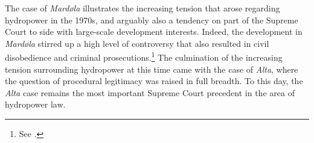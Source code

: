 


The case of {\it Mardøla} illustrates the increasing tension that arose regarding hydropower in the 1970s, and arguably also a tendency on part of the Supreme Court to side with large-scale development interests. Indeed, the development in {\it Mardøla} stirred up a high level of controversy that also resulted in civil disobedience and criminal prosecutions.\footnote{See \cite{mar71}.} The culmination of the increasing tension surrounding hydropower at this time came with the case of {\it Alta}, where the question of procedural legitimacy was raised in full breadth. To this day, the {\it Alta} case remains the most important Supreme Court precedent in the area of hydropower law.

